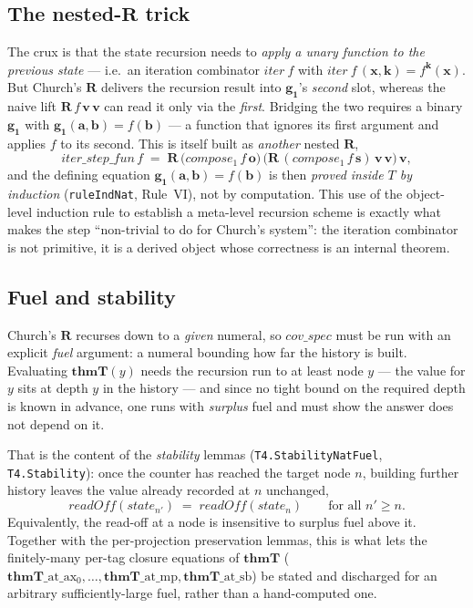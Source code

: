 \documentclass[11pt]{article}
\theoremstyle{plain}
\theoremstyle{definition}
\theoremstyle{remark}
\newcommand{\thmT}{\mathbf{thmT}}
\begin{document}
\subsection{The nested-\texorpdfstring{$\mathbf{R}$}{R} trick}

The crux is that the state recursion needs to \emph{apply a unary
function to the previous state} --- i.e.\ an iteration combinator
$\mathit{iter}\ f$ with $\mathit{iter}\ f\,(\mathbf{x},\mathbf{k}) =
f^{\mathbf{k}}(\mathbf{x})$.  But Church's $\mathbf{R}$ delivers the
recursion result into $\mathbf{g_1}$'s \emph{second} slot, whereas the
naive lift $\mathbf{R}\,f\,\mathbf{v}\,\mathbf{v}$ can read it only via
the \emph{first}.  Bridging the two requires a binary $\mathbf{g_1}$ with
$\mathbf{g_1}(\mathbf{a},\mathbf{b}) = f(\mathbf{b})$ --- a function that
ignores its first argument and applies $f$ to its second.  This is itself
built as \emph{another} nested $\mathbf{R}$,
\[
\mathit{iter\_step\_fun}\,f \;=\; \mathbf{R}\,\bigl(\mathit{compose_1}\,f\,\mathbf{o}\bigr)\,\bigl(\mathbf{R}\,(\mathit{compose_1}\,f\,\mathbf{s})\,\mathbf{v}\,\mathbf{v}\bigr)\,\mathbf{v},
\]
and the defining equation $\mathbf{g_1}(\mathbf{a},\mathbf{b}) =
f(\mathbf{b})$ is then \emph{proved inside $T$ by induction}
(\texttt{ruleIndNat}, Rule~VI), not by computation.  This use of the
object-level induction rule to establish a meta-level recursion scheme is
exactly what makes the step ``non-trivial to do for Church's system'':
the iteration combinator is not primitive, it is a derived object whose
correctness is an internal theorem.

\subsection{Fuel and stability}

Church's $\mathbf{R}$ recurses down to a \emph{given} numeral, so
$\mathit{cov\_spec}$ must be run with an explicit \emph{fuel} argument: a
numeral bounding how far the history is built.  Evaluating $\thmT(y)$ needs
the recursion run to at least node $y$ --- the value for $y$ sits at depth
$y$ in the history --- and since no tight bound on the required depth is
known in advance, one runs with \emph{surplus} fuel and must show the answer
does not depend on it.

That is the content of the \emph{stability} lemmas
(\verb|T4.StabilityNatFuel|, \verb|T4.Stability|): once the counter has
reached the target node $n$, building further history leaves the value
already recorded at $n$ unchanged,
\[
\mathit{readOff}(\mathit{state}_{n'}) \;=\; \mathit{readOff}(\mathit{state}_n)
\qquad\text{for all } n' \ge n .
\]
Equivalently, the read-off at a node is insensitive to surplus fuel above
it.  Together with the per-projection preservation lemmas, this is what lets
the finitely-many per-tag closure equations of $\thmT$
($\thmT\_\mathrm{at}\_\mathrm{ax_0}, \ldots, \thmT\_\mathrm{at}\_\mathrm{mp},
\thmT\_\mathrm{at}\_\mathrm{sb}$) be stated and discharged for an arbitrary
sufficiently-large fuel, rather than a hand-computed one.
\end{document}
